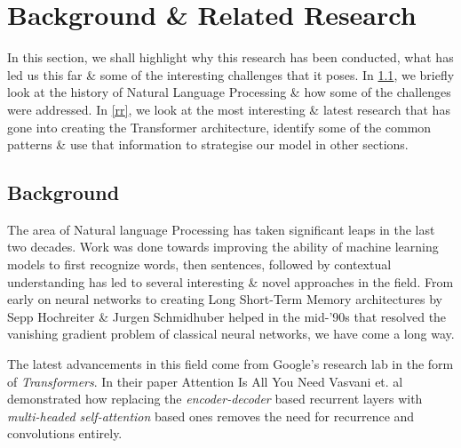 \documentclass[11pt]{article}
\begin{document}
\section{Background \& Related Research}\label{backRR}
In this section, we shall highlight why this research has been conducted, what has led us this far \& some of the interesting challenges that it poses. In \ref{back}, we briefly look at the history of Natural Language Processing \& how some of the challenges were addressed. In \ref{rr}, we look at the most interesting \& latest research that has gone into creating the Transformer architecture, identify some of the common patterns \& use that information to strategise our model in other sections.
\subsection{Background}\label{back}
The area of Natural language Processing has taken significant leaps in the last two decades. Work was done towards improving the ability of machine learning models to first recognize words, then sentences, followed by contextual understanding has led to several interesting \& novel approaches in the field. From early on neural networks to creating Long Short-Term Memory architectures\cite{originallstm} by Sepp Hochreiter \& Jurgen Schmidhuber helped in the mid-'90s that resolved the vanishing gradient problem of classical neural networks, we have come a long way.

The latest advancements in this field come from Google's research lab in the form of \textit{Transformers}\cite{atayl}. In their paper Attention Is All You Need\cite{atayl} Vasvani et. al demonstrated how replacing the \textit{encoder-decoder} based recurrent layers with \textit{multi-headed self-attention} based ones removes the need for recurrence and convolutions entirely.
\end{document}
